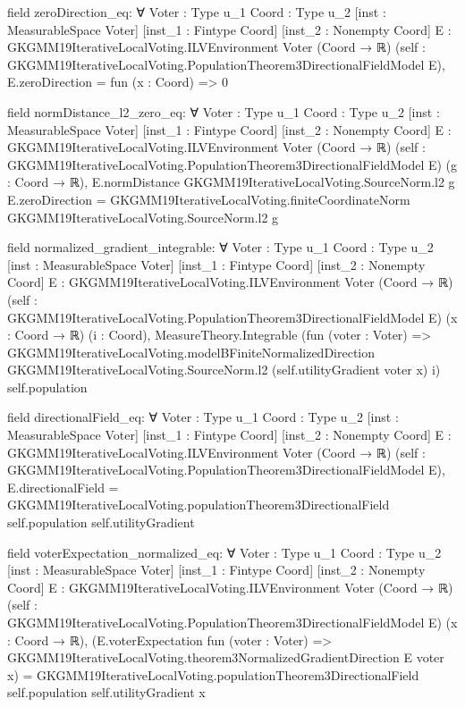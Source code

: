\documentclass[10pt]{article}
\begin{document}
\begin{ReviewVerbatim}
field zeroDirection_eq:
∀ {Voter : Type u_1} {Coord : Type u_2} [inst : MeasurableSpace Voter] [inst_1 : Fintype Coord]
  [inst_2 : Nonempty Coord] {E : GKGMM19IterativeLocalVoting.ILVEnvironment Voter (Coord → ℝ)}
  (self : GKGMM19IterativeLocalVoting.PopulationTheorem3DirectionalFieldModel E), E.zeroDirection = fun (x : Coord) => 0

field normDistance_l2_zero_eq:
∀ {Voter : Type u_1} {Coord : Type u_2} [inst : MeasurableSpace Voter] [inst_1 : Fintype Coord]
  [inst_2 : Nonempty Coord] {E : GKGMM19IterativeLocalVoting.ILVEnvironment Voter (Coord → ℝ)}
  (self : GKGMM19IterativeLocalVoting.PopulationTheorem3DirectionalFieldModel E) (g : Coord → ℝ),
  E.normDistance GKGMM19IterativeLocalVoting.SourceNorm.l2 g E.zeroDirection =
    GKGMM19IterativeLocalVoting.finiteCoordinateNorm GKGMM19IterativeLocalVoting.SourceNorm.l2 g

field normalized_gradient_integrable:
∀ {Voter : Type u_1} {Coord : Type u_2} [inst : MeasurableSpace Voter] [inst_1 : Fintype Coord]
  [inst_2 : Nonempty Coord] {E : GKGMM19IterativeLocalVoting.ILVEnvironment Voter (Coord → ℝ)}
  (self : GKGMM19IterativeLocalVoting.PopulationTheorem3DirectionalFieldModel E) (x : Coord → ℝ) (i : Coord),
  MeasureTheory.Integrable
    (fun (voter : Voter) =>
      GKGMM19IterativeLocalVoting.modelBFiniteNormalizedDirection GKGMM19IterativeLocalVoting.SourceNorm.l2
        (self.utilityGradient voter x) i)
    self.population

field directionalField_eq:
∀ {Voter : Type u_1} {Coord : Type u_2} [inst : MeasurableSpace Voter] [inst_1 : Fintype Coord]
  [inst_2 : Nonempty Coord] {E : GKGMM19IterativeLocalVoting.ILVEnvironment Voter (Coord → ℝ)}
  (self : GKGMM19IterativeLocalVoting.PopulationTheorem3DirectionalFieldModel E),
  E.directionalField =
    GKGMM19IterativeLocalVoting.populationTheorem3DirectionalField self.population self.utilityGradient

field voterExpectation_normalized_eq:
∀ {Voter : Type u_1} {Coord : Type u_2} [inst : MeasurableSpace Voter] [inst_1 : Fintype Coord]
  [inst_2 : Nonempty Coord] {E : GKGMM19IterativeLocalVoting.ILVEnvironment Voter (Coord → ℝ)}
  (self : GKGMM19IterativeLocalVoting.PopulationTheorem3DirectionalFieldModel E) (x : Coord → ℝ),
  (E.voterExpectation fun (voter : Voter) =>
      GKGMM19IterativeLocalVoting.theorem3NormalizedGradientDirection E voter x) =
    GKGMM19IterativeLocalVoting.populationTheorem3DirectionalField self.population self.utilityGradient x
\end{ReviewVerbatim}
\end{document}
